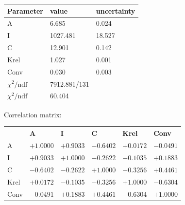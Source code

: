 \begin{tabular}{l|ll}
Parameter & value & uncertainty \\ \hline
 A & 6.685 & 0.024 \\ 
 I & 1027.481 & 18.527 \\ 
 C & 12.901 & 0.142 \\ 
 Krel & 1.027 & 0.001 \\ 
 Conv & 0.030 & 0.003 \\ 
 \hline
 $\chi^2/\mathrm{ndf}$ & 7912.881/131 & \\
 $\chi^2/\mathrm{ndf}$ & 60.404 & \\
\end{tabular}

Correlation matrix:

\begin{tabular}{l|lllll} 
 & A & I & C & Krel & Conv \\ \hline
 A & $+1.0000$ & $+0.9033$ & $-0.6402$ & $+0.0172$ & $-0.0491$ \\ 
 I & $+0.9033$ & $+1.0000$ & $-0.2622$ & $-0.1035$ & $+0.1883$ \\ 
 C & $-0.6402$ & $-0.2622$ & $+1.0000$ & $-0.3256$ & $+0.4461$ \\ 
 Krel & $+0.0172$ & $-0.1035$ & $-0.3256$ & $+1.0000$ & $-0.6304$ \\ 
 Conv & $-0.0491$ & $+0.1883$ & $+0.4461$ & $-0.6304$ & $+1.0000$ \\ 
\end{tabular}

